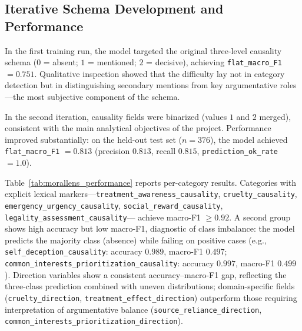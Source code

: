 \documentclass[14pt,a4paper]{extarticle}
\begin{document}
\subsection{Iterative Schema Development and Performance}

In the first training run, the model targeted the original three-level causality
schema ($0$ = absent; $1$ = mentioned; $2$ = decisive), achieving
\texttt{flat\_macro\_F1} $= 0.751$. Qualitative inspection showed that the
difficulty lay not in category detection but in distinguishing secondary mentions
from key argumentative roles---the most subjective component of the schema.

In the second iteration, causality fields were binarized (values $1$ and $2$
merged), consistent with the main analytical objectives of the project. Performance
improved substantially: on the held-out test set ($n = 376$), the model achieved
\texttt{flat\_macro\_F1} $= 0.813$ (precision $0.813$, recall $0.815$,
\texttt{prediction\_ok\_rate} $= 1.0$).

Table~\ref{tab:morallens_performance} reports per-category results. Categories
with explicit lexical markers---\texttt{treatment\_awareness\_causality},
\texttt{cruelty\_causality}, \texttt{emergency\_urgency\_causality},
\texttt{social\_reward\_causality}, \texttt{legality\_assessment\_causality}---%
achieve macro-F1 $\geq 0.92$. A second group shows high accuracy but low
macro-F1, diagnostic of class imbalance: the model predicts the majority class
(absence) while failing on positive cases (e.g.,
\texttt{self\_deception\_causality}: accuracy $0.989$, macro-F1 $0.497$;
\texttt{common\_interests\_prioritization\_causality}: accuracy $0.997$,
macro-F1 $0.499$). Direction variables show a consistent accuracy--macro-F1
gap, reflecting the three-class prediction combined with uneven distributions;
domain-specific fields (\texttt{cruelty\_direction},
\texttt{treatment\_effect\_direction}) outperform those requiring interpretation
of argumentative balance (\texttt{source\_reliance\_direction},
\texttt{common\_interests\_prioritization\_direction}).
\end{document}
